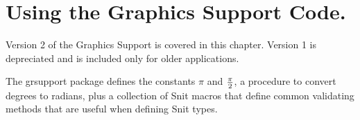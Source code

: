 
\chapter{Using the Graphics Support Code.}
\label{chapt:GraphicsSupport}

Version 2 of the Graphics Support is covered in this chapter.  Version
1 is depreciated and is included only for older applications.

The grsupport package defines the constants $\pi$ and $\pi \over 2$, a
procedure to convert degrees to radians, plus a collection of Snit
macros that define common validating methods that are useful when
defining Snit types.

